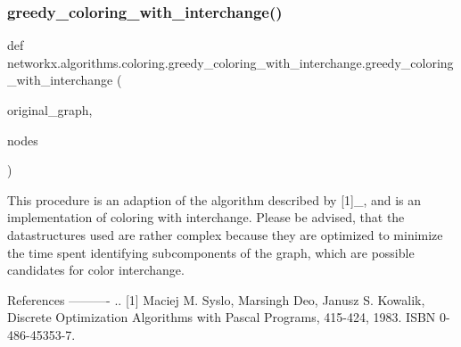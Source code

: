 \subsubsection{\texorpdfstring{greedy\+\_\+coloring\+\_\+with\+\_\+interchange()}{greedy\_coloring\_with\_interchange()}}
{\footnotesize\ttfamily def networkx.\+algorithms.\+coloring.\+greedy\+\_\+coloring\+\_\+with\+\_\+interchange.\+greedy\+\_\+coloring\+\_\+with\+\_\+interchange (\begin{DoxyParamCaption}\item[{}]{original\+\_\+graph,  }\item[{}]{nodes }\end{DoxyParamCaption})}

\begin{DoxyVerb}    This procedure is an adaption of the algorithm described by [1]_,
    and is an implementation of coloring with interchange. Please be
    advised, that the datastructures used are rather complex because
    they are optimized to minimize the time spent identifying
    subcomponents of the graph, which are possible candidates for color
    interchange.

References
----------
.. [1] Maciej M. Syslo, Marsingh Deo, Janusz S. Kowalik,
   Discrete Optimization Algorithms with Pascal Programs, 415-424, 1983.
   ISBN 0-486-45353-7.
\end{DoxyVerb}
 
